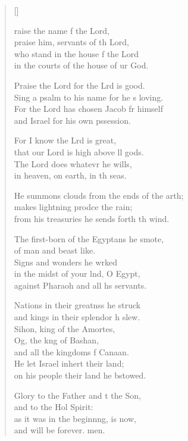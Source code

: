 \settowidth{\versewidth}{He summons clouds from the ends of the earth; +}
\begin{verse}[\versewidth]
  \begin{patverse}
raise the name f the Lord,\Med\\
praise him, servants of th Lord,\\
who stand in the house f the Lord\Med\\
in the courts of the house of ur God.

Praise the Lord for the Lrd is good.\Med\\
Sing a psalm to his name for he \pointup{\i}s loving.\\
For the Lord has chosen Jacob fr himself\Med\\
and Israel for his own pssession.

For I know the Lrd is great,\Med\\
that our Lord is high above ll gods.\\
The Lord does whatevr he wills,\Med\\
in heaven, on earth, in th seas.

He summons clouds from the ends of the arth;\Flex\\
makes lightning prodce the rain;\Med\\
from his treasuries he sends forth th wind.

The first-born of the Egypt\pointup{\i}ans he smote,\Med\\
of man and beast like.\\
Signs and wonders he wrked\Flex\\
in the midst of your lnd, O Egypt,\Med\\
against Pharaoh and all h\pointup{\i}s servants.

Nations in their greatnss he struck\Med\\
and kings in their splendor h slew.\\
Sihon, king of the Amor\pointup{\i}tes,\Flex\\
Og, the k\pointup{\i}ng of Bashan,\Med\\
and all the kingdoms f Canaan.\\
He let Israel inher\pointup{\i}t their land;\Med\\
on his people their land he bstowed.

Glory to the Father and t the Son,\Med\\
and to the Hol Spirit:\\
as it was in the beginn\pointup{\i}ng, is now,\Med\\
and will be forever. men.
  \end{patverse}
\end{verse}
